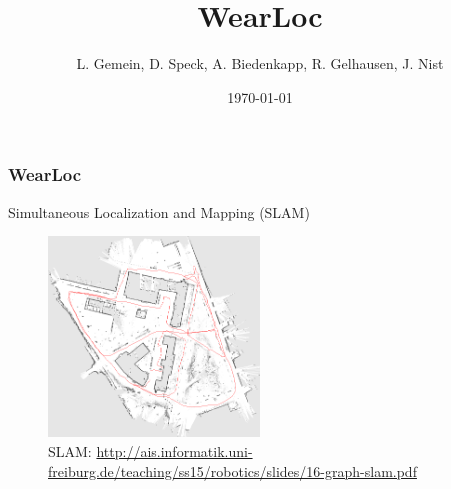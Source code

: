 \documentclass{beamer}
\title{WearLoc}
\author{L. Gemein, D. Speck, A. Biedenkapp, R. Gelhausen, J. Nist}
\date{\today}
\begin{document}
\maketitle

\begin{frame} %
  \frametitle{WearLoc}%
  \begin{center}Simultaneous Localization and Mapping (SLAM)
  \end{center}
  \begin{figure}
  \includegraphics[width=0.5\textwidth]{slam.png} 
  \caption{SLAM: \url{http://ais.informatik.uni-freiburg.de/teaching/ss15/robotics/slides/16-graph-slam.pdf}}
  \end{figure}
\end{frame}
\end{document}
